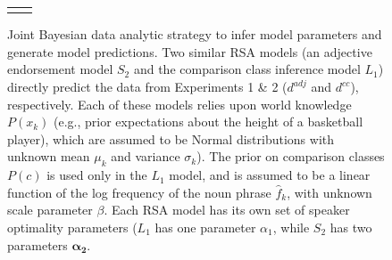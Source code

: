 \documentclass[doc]{apa6}
\begin{document}
\begin{figure}[ht]
\begin{center}
\begin{tabular}{cc}
\begin{tikzpicture}
    




%


\end{tikzpicture}

    \end{tabular}
  \end{center}
  \caption{\small Joint Bayesian data analytic strategy to infer model parameters and generate model predictions. Two similar RSA models (an adjective endorsement model $S_2$ and the comparison class inference model $L_1$) directly predict the data from Experiments 1 \& 2 ($d^{adj}$ and $d^{cc}$), respectively. Each of these models relies upon world knowledge $P(x_k)$ (e.g., prior expectations about the height of a basketball player), which are assumed to be Normal distributions with unknown mean $\mu_k$ and variance $\sigma_k$). The prior on comparison classes $P(c)$ is used only in the $L_1$ model, and is assumed to be a linear function of the log frequency of the noun phrase $\hat{f}_k$, with unknown scale parameter $\beta$. Each RSA model has its own set of speaker optimality parameters ($L_1$ has one parameter $\alpha_1$, while $S_2$ has two parameters $\boldsymbol{\alpha_2}$.}
  \label{fig:bayesnet}
\end{figure}





%
%
%
\end{document}
